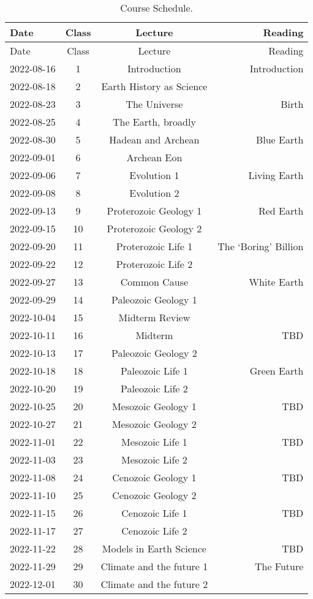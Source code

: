 \documentclass[11pt,]{article}
\begin{document}
\begin{longtable}[]{@{}lccr@{}}
\caption{Course Schedule.}\tabularnewline
\toprule()
Date & Class & Lecture & Reading \\
\midrule()
\endfirsthead
\toprule()
Date & Class & Lecture & Reading \\
\midrule()
\endhead
2022-08-16 & 1 & Introduction & Introduction \\
2022-08-18 & 2 & Earth History as Science & \\
2022-08-23 & 3 & The Universe & Birth \\
2022-08-25 & 4 & The Earth, broadly & \\
2022-08-30 & 5 & Hadean and Archean & Blue Earth \\
2022-09-01 & 6 & Archean Eon & \\
2022-09-06 & 7 & Evolution 1 & Living Earth \\
2022-09-08 & 8 & Evolution 2 & \\
2022-09-13 & 9 & Proterozoic Geology 1 & Red Earth \\
2022-09-15 & 10 & Proterozoic Geology 2 & \\
2022-09-20 & 11 & Proterozoic Life 1 & The `Boring' Billion \\
2022-09-22 & 12 & Proterozoic Life 2 & \\
2022-09-27 & 13 & Common Cause & White Earth \\
2022-09-29 & 14 & Paleozoic Geology 1 & \\
2022-10-04 & 15 & Midterm Review & \\
2022-10-11 & 16 & Midterm & TBD \\
2022-10-13 & 17 & Paleozoic Geology 2 & \\
2022-10-18 & 18 & Paleozoic Life 1 & Green Earth \\
2022-10-20 & 19 & Paleozoic Life 2 & \\
2022-10-25 & 20 & Mesozoic Geology 1 & TBD \\
2022-10-27 & 21 & Mesozoic Geology 2 & \\
2022-11-01 & 22 & Mesozoic Life 1 & TBD \\
2022-11-03 & 23 & Mesozoic Life 2 & \\
2022-11-08 & 24 & Cenozoic Geology 1 & TBD \\
2022-11-10 & 25 & Cenozoic Geology 2 & \\
2022-11-15 & 26 & Cenozoic Life 1 & TBD \\
2022-11-17 & 27 & Cenozoic Life 2 & \\
2022-11-22 & 28 & Models in Earth Science & TBD \\
2022-11-29 & 29 & Climate and the future 1 & The Future \\
2022-12-01 & 30 & Climate and the future 2 & \\
\bottomrule()
\end{longtable}
\end{document}
